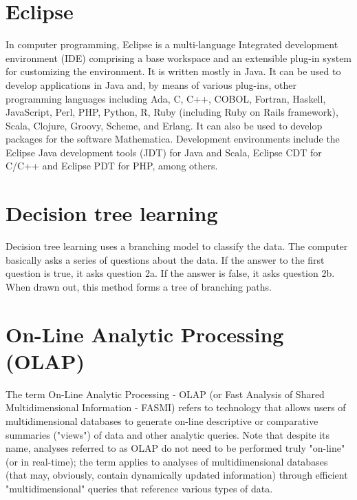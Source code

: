 \documentclass[11pt]{article} %
\begin{document}
\section{Eclipse}
In computer programming, Eclipse is a multi-language Integrated development environment (IDE) comprising a base workspace and an extensible plug-in system for customizing the environment. It is written mostly in Java. It can be used to develop applications in Java and, by means of various plug-ins, other programming languages including Ada, C, C++, COBOL, Fortran, Haskell, JavaScript, Perl, PHP, Python, R, Ruby (including Ruby on Rails framework), Scala, Clojure, Groovy, Scheme, and Erlang. It can also be used to develop packages for the software Mathematica. Development environments include the Eclipse Java development tools (JDT) for Java and Scala, Eclipse CDT for C/C++ and Eclipse PDT for PHP, among others.



\section{Decision tree learning}

Decision tree learning uses a branching model to classify the data. The computer basically asks a series of questions about the data. If the answer to the first question is true, it asks question 2a. If the answer is false, it asks question 2b. When drawn out, this method forms a tree of branching paths.














\section{On-Line Analytic Processing (OLAP)}


The term On-Line Analytic Processing - OLAP (or Fast Analysis of Shared Multidimensional Information - FASMI) refers to technology that allows users of multidimensional databases to generate on-line descriptive or comparative summaries ("views") of data and other analytic queries. Note that despite its name, analyses referred to as OLAP do not need to be performed truly "on-line" (or in real-time); the term applies to analyses of multidimensional databases (that may, obviously, contain dynamically updated information) through efficient "multidimensional" queries that reference various types of data. 
\end{document}
